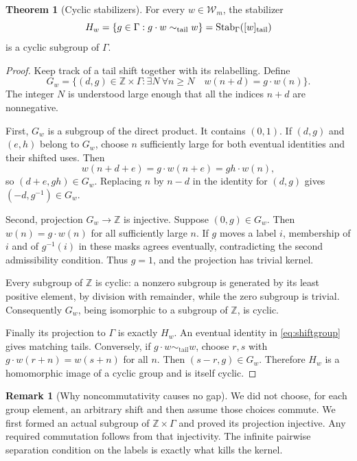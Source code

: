 \documentclass[11pt,letterpaper]{article}
\theoremstyle{definition}
\newtheorem{theorem}[definition]{Theorem}
\newtheorem{remark}[definition]{Remark}
\numberwithin{equation}{section}
\newcommand{\Stab}{\operatorname{Stab}}
\newcommand{\Tail}{\mathrel{\sim_{\mathrm{tail}}}}
\newcommand{\Z}{\mathbb Z}
\newcommand{\W}{\mathcal W}
\begin{document}
\begin{theorem}[Cyclic stabilizers]\label{thm:cyclic}
For every $w\in\W_m$, the stabilizer
\[
 H_w=\{g\in\Gamma:g\cdot w\Tail w\}
       =\Stab_\Gamma([w]_{\rm tail})
\]
is a cyclic subgroup of $\Gamma$.
\end{theorem}

\begin{proof}
Keep track of a tail shift together with its relabelling. Define
\begin{equation}\label{eq:shiftgroup}
 G_w=\{(d,g)\in\Z\times\Gamma:
       \exists N\ \forall n\ge N\quad w(n+d)=g\cdot w(n)\}.
\end{equation}
The integer $N$ is understood large enough that all the indices $n+d$ are nonnegative.

First, $G_w$ is a subgroup of the direct product. It contains $(0,1)$. If $(d,g)$ and $(e,h)$ belong to $G_w$, choose $n$ sufficiently large for both eventual identities and their shifted uses. Then
\[
 w(n+d+e)=g\cdot w(n+e)=gh\cdot w(n),
\]
so $(d+e,gh)\in G_w$. Replacing $n$ by $n-d$ in the identity for $(d,g)$ gives $( -d,g^{-1})\in G_w$.

Second, projection $G_w\to\Z$ is injective. Suppose $(0,g)\in G_w$. Then $w(n)=g\cdot w(n)$ for all sufficiently large $n$. If $g$ moves a label $i$, membership of $i$ and of $g^{-1}(i)$ in these masks agrees eventually, contradicting the second admissibility condition. Thus $g=1$, and the projection has trivial kernel.

Every subgroup of $\Z$ is cyclic: a nonzero subgroup is generated by its least positive element, by division with remainder, while the zero subgroup is trivial. Consequently $G_w$, being isomorphic to a subgroup of $\Z$, is cyclic.

Finally its projection to $\Gamma$ is exactly $H_w$. An eventual identity in \eqref{eq:shiftgroup} gives matching tails. Conversely, if $g\cdot w\Tail w$, choose $r,s$ with $g\cdot w(r+n)=w(s+n)$ for all $n$. Then $(s-r,g)\in G_w$. Therefore $H_w$ is a homomorphic image of a cyclic group and is itself cyclic.
\end{proof}

\begin{remark}[Why noncommutativity causes no gap]
We did not choose, for each group element, an arbitrary shift and then assume those choices commute. We first formed an actual subgroup of $\Z\times\Gamma$ and proved its projection injective. Any required commutation follows from that injectivity. The infinite pairwise separation condition on the labels is exactly what kills the kernel.
\end{remark}
\end{document}
